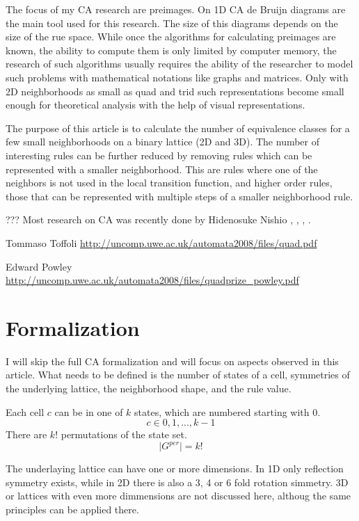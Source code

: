 \documentclass{ijuc}
\begin{document}
The focus of my CA research are preimages. On 1D CA de Bruijn diagrams are the main tool
used for this research. The size of this diagrams depends on the size of the rue space.
While once the algorithms for calculating preimages are known, the ability to compute
them is only limited by computer memory, the research of such algorithms usually requires
the ability of the researcher to model such problems with mathematical notations like
graphs and matrices. Only with 2D neighborhoods as small as quad and trid such representations
become small enough for theoretical analysis with the help of visual representations.

The purpose of this article is to calculate the number of equivalence classes for a few small
neighborhoods on a binary lattice (2D and 3D). The number of interesting rules can be further
reduced by removing rules which can be represented with a smaller neighborhood. This are rules
where one of the neighbors is not used in the local transition function, and higher order rules,
those that can be represented with multiple steps of a smaller neighborhood rule.

??? Most research on CA was recently done by Hidenosuke Nishio \cite{DBLP:journals/jca/Nishio12},
\cite{DBLP:journals/fuin/Nishio10}, \cite{DBLP:conf/ncma/Nishio09}, \cite{DBLP:conf/automata/NishioW08}.

Tommaso Toffoli
\url{http://uncomp.uwe.ac.uk/automata2008/files/quad.pdf}

Edward Powley
\url{http://uncomp.uwe.ac.uk/automata2008/files/quadprize_powley.pdf}

\section{Formalization}

I will skip the full CA formalization and will focus on aspects observed in this article.
What needs to be defined is the number of states of a cell, symmetries of the underlying lattice,
the neighborhood shape, and the rule value.

Each cell \(c\) can be in one of \(k\) states, which are numbered starting with 0.
\[ c \in {0, 1, ..., k-1} \]
There are \(k!\) permutations of the state set.
\[ \vert G^{per} \vert = k! \]

The underlaying lattice can have one or more dimensions. In 1D only reflection symmetry exists,
while in 2D there is also a 3, 4 or 6 fold rotation simmetry. 3D or lattices with even more
dimmensions are not discussed here, althoug the same principles can be applied there.
\end{document}
